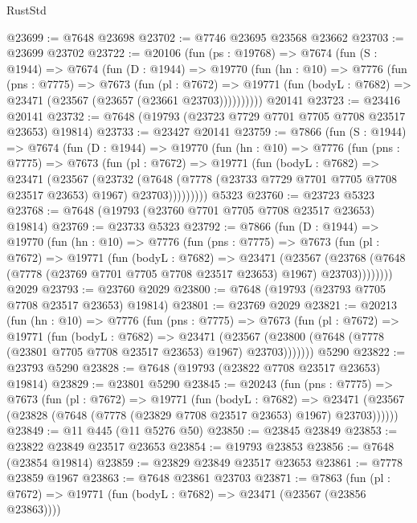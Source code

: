 \begin{lexlean}{RustStd}
\begin{coremodule}
@23699 := @7648 @23698
@23702 := @7746 @23695 @23568 @23662
@23703 := @23699 @23702
@23722 := @20106
    (fun (ps : @19768) =>
    @7674
      (fun (S : @1944) =>
      @7674
        (fun (D : @1944) =>
        @19770
          (fun (hn : @10) =>
          @7776
            (fun (pns : @7775) =>
            @7673
              (fun (pl : @7672) =>
              @19771 (fun (bodyL : @7682) => @23471 (@23567 (@23657 (@23661 @23703))))))))))
    @20141
@23723 := @23416 @20141
@23732 := @7648 (@19793 (@23723 @7729 @7701 @7705 @7708 @23517 @23653) @19814)
@23733 := @23427 @20141
@23759 := @7866
    (fun (S : @1944) =>
    @7674
      (fun (D : @1944) =>
      @19770
        (fun (hn : @10) =>
        @7776
          (fun (pns : @7775) =>
          @7673
            (fun (pl : @7672) =>
            @19771
              (fun (bodyL : @7682) =>
              @23471
                (@23567
                  (@23732
                    (@7648
                      (@7778 (@23733 @7729 @7701 @7705 @7708 @23517 @23653) @1967)
                      @23703)))))))))
    @5323
@23760 := @23723 @5323
@23768 := @7648 (@19793 (@23760 @7701 @7705 @7708 @23517 @23653) @19814)
@23769 := @23733 @5323
@23792 := @7866
    (fun (D : @1944) =>
    @19770
      (fun (hn : @10) =>
      @7776
        (fun (pns : @7775) =>
        @7673
          (fun (pl : @7672) =>
          @19771
            (fun (bodyL : @7682) =>
            @23471
              (@23567
                (@23768 (@7648 (@7778 (@23769 @7701 @7705 @7708 @23517 @23653) @1967) @23703))))))))
    @2029
@23793 := @23760 @2029
@23800 := @7648 (@19793 (@23793 @7705 @7708 @23517 @23653) @19814)
@23801 := @23769 @2029
@23821 := @20213
    (fun (hn : @10) =>
    @7776
      (fun (pns : @7775) =>
      @7673
        (fun (pl : @7672) =>
        @19771
          (fun (bodyL : @7682) =>
          @23471
            (@23567 (@23800 (@7648 (@7778 (@23801 @7705 @7708 @23517 @23653) @1967) @23703)))))))
    @5290
@23822 := @23793 @5290
@23828 := @7648 (@19793 (@23822 @7708 @23517 @23653) @19814)
@23829 := @23801 @5290
@23845 := @20243
    (fun (pns : @7775) =>
    @7673
      (fun (pl : @7672) =>
      @19771
        (fun (bodyL : @7682) =>
        @23471 (@23567 (@23828 (@7648 (@7778 (@23829 @7708 @23517 @23653) @1967) @23703))))))
@23849 := @11 @445 (@11 @5276 @50)
@23850 := @23845 @23849
@23853 := @23822 @23849 @23517 @23653
@23854 := @19793 @23853
@23856 := @7648 (@23854 @19814)
@23859 := @23829 @23849 @23517 @23653
@23861 := @7778 @23859 @1967
@23863 := @7648 @23861 @23703
@23871 := @7863
    (fun (pl : @7672) => @19771 (fun (bodyL : @7682) => @23471 (@23567 (@23856 @23863))))

\end{coremodule}
\end{lexlean}
